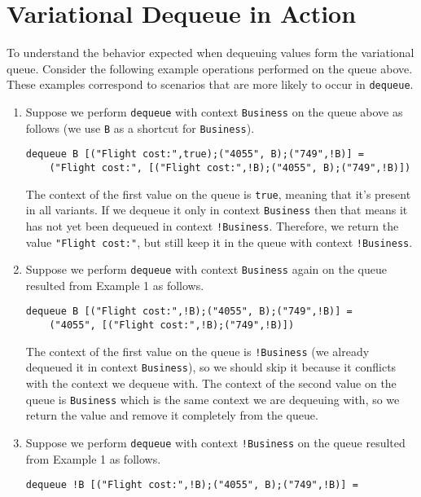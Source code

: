 \section{Variational Dequeue in Action}
\label{sec:queue_dequeue_ex}

To understand the behavior expected when dequeuing values form the variational queue. Consider the following example operations performed on the queue above. These examples correspond to scenarios that are more likely to occur in \texttt{dequeue}. 
%
\begin{enumerate}[label=Example \arabic*:]
%
\item Suppose we perform \texttt{dequeue} with context \texttt{Business} on the queue above as follows (we use \texttt{B} as a shortcut for \texttt{Business}).
%
\begin{lstlisting}
dequeue B [("Flight cost:",true);("4055", B);("749",!B)] = 
    ("Flight cost:", [("Flight cost:",!B);("4055", B);("749",!B)])
\end{lstlisting}
The context of the first value on the queue is \texttt{true}, meaning that it's present in all variants. If we dequeue it only in context \texttt{Business} then that means it has not yet been dequeued in context \texttt{!Business}. Therefore, we return the value \texttt{"Flight cost:"}, but still keep it in the queue with context \texttt{!Business}.  
%
\item Suppose we perform \texttt{dequeue} with context \texttt{Business} again on the queue resulted from Example 1 as follows. 
%
\begin{lstlisting}
dequeue B [("Flight cost:",!B);("4055", B);("749",!B)] = 
    ("4055", [("Flight cost:",!B);("749",!B)])
\end{lstlisting}
%
The context of the first value on the queue is \texttt{!Business} (we already dequeued it in context \texttt{Business}), so we should skip it because it conflicts with the context we dequeue with. The context of the second value on the queue is \texttt{Business} which is the same context we are dequeuing with, so we return the value and remove it completely from the queue. 
%
\item Suppose we perform \texttt{dequeue} with context \texttt{!Business} on the queue resulted from Example 1 as follows. 
%
\begin{lstlisting}
dequeue !B [("Flight cost:",!B);("4055", B);("749",!B)] = 

\end{lstlisting}
\end{enumerate}
